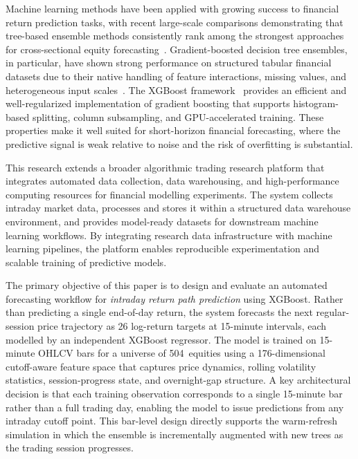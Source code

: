 \documentclass[conference]{IEEEtran}
\begin{document}
Machine learning methods have been applied with growing success to financial return prediction tasks, with recent large-scale comparisons demonstrating that tree-based ensemble methods consistently rank among the strongest approaches for cross-sectional equity forecasting~\cite{gu2020empirical}. Gradient-boosted decision tree ensembles, in particular, have shown strong performance on structured tabular financial datasets due to their native handling of feature interactions, missing values, and heterogeneous input scales~\cite{krauss2017deep}. The XGBoost framework~\cite{chen2016xgboost} provides an efficient and well-regularized implementation of gradient boosting that supports histogram-based splitting, column subsampling, and GPU-accelerated training. These properties make it well suited for short-horizon financial forecasting, where the predictive signal is weak relative to noise and the risk of overfitting is substantial.

This research extends a broader algorithmic trading research platform that integrates automated data collection, data warehousing, and high-performance computing resources for financial modelling experiments. The system collects intraday market data, processes and stores it within a structured data warehouse environment, and provides model-ready datasets for downstream machine learning workflows. By integrating research data infrastructure with machine learning pipelines, the platform enables reproducible experimentation and scalable training of predictive models.

The primary objective of this paper is to design and evaluate an automated forecasting workflow for \emph{intraday return path prediction} using XGBoost. Rather than predicting a single end-of-day return, the system forecasts the next regular-session price trajectory as 26 log-return targets at 15-minute intervals, each modelled by an independent XGBoost regressor. The model is trained on 15-minute OHLCV bars for a universe of 504~equities using a 176-dimensional cutoff-aware feature space that captures price dynamics, rolling volatility statistics, session-progress state, and overnight-gap structure. A key architectural decision is that each training observation corresponds to a single 15-minute bar rather than a full trading day, enabling the model to issue predictions from any intraday cutoff point. This bar-level design directly supports the warm-refresh simulation in which the ensemble is incrementally augmented with new trees as the trading session progresses.
\end{document}
